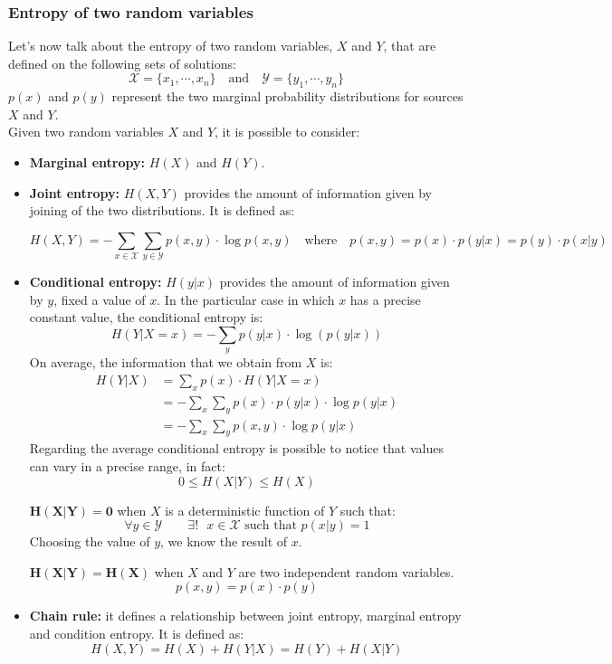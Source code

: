 \subsubsection{Entropy of two random variables} Let's now talk about the entropy of two random variables, $X$ and $Y$, that are defined on the following sets of solutions:
$$\mathcal{X} = \{x_1, \cdots, x_n\} \quad \text{and} \quad \mathcal{Y} = \{y_1, \cdots, y_n\}$$
$p(x)$ and $p(y)$ represent the two marginal probability distributions for sources $X$ and $Y$.\\
Given two random variables $X$ and $Y$, it is possible to consider:
\begin{itemize}
	\item \textbf{Marginal entropy:} $H(X)$ and $H(Y)$.
	\item \textbf{Joint entropy:} $H(X, Y)$ provides the amount of information given by joining of the two distributions. It is defined as:
	
	$$H(X,Y) = -\sum_{x \in \mathcal{X}} \sum_{y \in \mathcal{Y}} p(x,y) \cdot \log p(x,y) \quad \text{where} \quad p(x,y) = p(x) \cdot p(y|x) = p(y) \cdot p(x|y)$$
	
	\item \textbf{Conditional entropy:} $H(y|x)$ provides the amount of information given by $y$, fixed a value of $x$. In the particular case in which $x$ has a precise constant value, the conditional entropy is:
	$$H(Y|X=x) = - \sum_y p(y|x) \cdot \log(p(y|x))$$
	On average, the information that we obtain from $X$ is:
	\begin{equation*}
	\begin{split}
	H(Y|X) &= \sum_x p(x) \cdot H(Y|X=x)\\
	&= - \sum_x \sum_y p(x) \cdot p(y|x) \cdot \log p(y|x)\\
	&= - \sum_x \sum_y p(x,y) \cdot \log p(y|x)		
	\end{split}
	\end{equation*}
	Regarding the average conditional entropy is possible to notice that values can vary in a precise range, in fact:
	$$0 \leq H(X|Y) \leq H(X)$$
	
	$\mathbf{H(X|Y) = 0}$ when $X$ is a deterministic function of $Y$ such that:
	$$\forall y \in \mathcal{Y} \qquad \exists!\text{ }x \in \mathcal{X} \text{ such that } p(x|y) = 1$$
	Choosing the value of $y$, we know the result of $x$. 
	
	$\mathbf{H(X|Y) = H(X)}$ when $X$ and $Y$ are two independent random variables.
	$$p(x,y) = p(x)\cdot p(y)$$
	\item \textbf{Chain rule:} it defines a relationship between joint entropy, marginal entropy and condition entropy. It is defined as:
	$$H(X,Y) = H(X) + H(Y|X) = H(Y) + H(X|Y)$$
	

\end{itemize}
